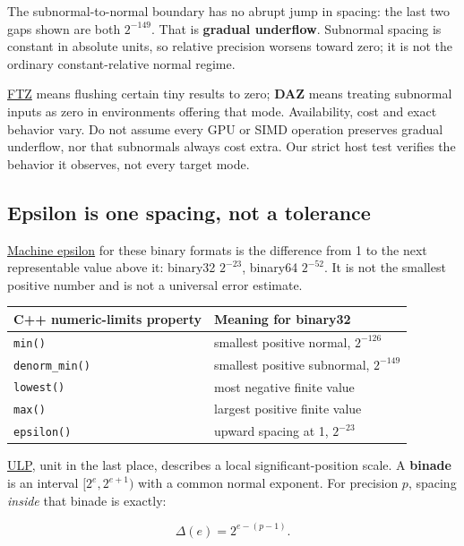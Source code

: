 The subnormal-to-normal boundary has no abrupt jump in spacing: the last two gaps shown are both \(2^{-149}\). That is \textbf{gradual underflow}. Subnormal spacing is constant in absolute units, so relative precision worsens toward zero; it is not the ordinary constant-relative normal regime.

\hyperref[appendix-e979eb012782]{FTZ} means flushing certain tiny results to zero; \textbf{DAZ} means treating subnormal inputs as zero in environments offering that mode. Availability, cost and exact behavior vary. Do not assume every GPU or SIMD operation preserves gradual underflow, nor that subnormals always cost extra. Our strict host test verifies the behavior it observes, not every target mode.

\subsection{Epsilon is one spacing, not a tolerance}\label{01-foundations-i-ch001-epsilon-is-one-spacing-not-a-tolerance}

\hyperref[appendix-390ea641da54]{Machine epsilon} for these binary formats is the difference from 1 to the next representable value above it: binary32 \(2^{-23}\), binary64 \(2^{-52}\). It is not the smallest positive number and is not a universal error estimate.

{\def\LTcaptype{none} %
\begin{longtable}[]{@{}ll@{}}
\toprule\noalign{}
C++ numeric-limits property & Meaning for binary32 \\
\midrule\noalign{}
\endhead
\bottomrule\noalign{}
\endlastfoot
\texttt{min()} & smallest positive normal, \(2^{-126}\) \\
\texttt{denorm\_min()} & smallest positive subnormal, \(2^{-149}\) \\
\texttt{lowest()} & most negative finite value \\
\texttt{max()} & largest positive finite value \\
\texttt{epsilon()} & upward spacing at 1, \(2^{-23}\) \\
\end{longtable}
}

\hyperref[appendix-14bab4cab9d4]{ULP}, unit in the last place, describes a local significant-position scale. A \textbf{binade} is an interval \([2^e,2^{e+1})\) with a common normal exponent. For precision \(p\), spacing \emph{inside} that binade is exactly:

\[
\Delta(e)=2^{e-(p-1)}.
\]


